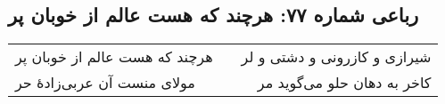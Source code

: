 \begin{center}
\section*{رباعی شماره ۷۷: هرچند که هست عالم از خوبان پر}
\label{sec:077}
\begin{longtable}{l p{0.5cm} r}
هرچند که هست عالم از خوبان پر
&&
شیرازی و کازرونی و دشتی و لر
\\
مولای منست آن عربی‌زادهٔ حر
&&
کاخر به دهان حلو می‌گوید مر
\\
\end{longtable}
\end{center}
